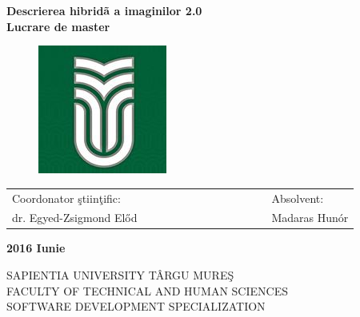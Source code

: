 \documentclass[12pt, a4paper, oneside]{book}
\theoremstyle{tetel}
\begin{document}
\begin{center}
    \vspace{3cm}\LARGE \textbf{Descrierea hibridã a imaginilor 2.0}\\
    \vspace{1cm}\LARGE\textbf{Lucrare de master}\\
\end{center}

\vspace{2cm}
\begin{figure}[htb]
\hspace{5.7cm}\includegraphics[bb = 0 0 160 160]{sapi.jpg}
\end{figure}

\vspace{2cm}
\begin{center}
\begin{tabular}{lcccccccccccl}
    Coordonator \c{s}tiin\c{t}ific:&&&&&&& &&&&&Absolvent:\\
     dr. Egyed-Zsigmond Előd&&&&&& &&&&&&Madaras Hunór\\

\end{tabular}
\end{center}

\begin{center}
    \vspace{1cm}\textbf{2016 Iunie}
\end{center}


\newpage
\thispagestyle{empty}
\begin{center}
    \Large SAPIENTIA UNIVERSITY TÂRGU MURE\c{S}\\
    \Large FACULTY OF TECHNICAL AND HUMAN SCIENCES\\
    \Large SOFTWARE DEVELOPMENT SPECIALIZATION\\
\end{center}
\end{document}
